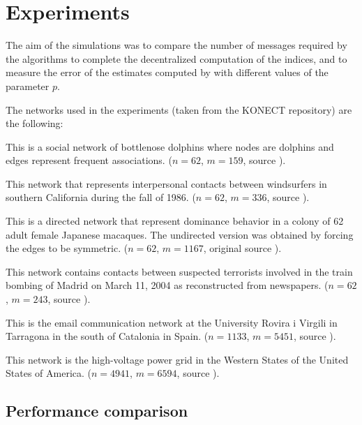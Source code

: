 
\section{Experiments}
\label{sec:exp}

The aim of the simulations was to compare the number of messages required by the algorithms to complete the decentralized computation of the indices, and to measure the error of the estimates computed by \multibfs{} with different values of the parameter $p$.

The networks used in the experiments (taken from the KONECT \cite{konect} repository) are the following:
\begin{description}[leftmargin=0cm]
 \item[\texttt{dolphins}] This is a social network of bottlenose dolphins where nodes are dolphins and edges represent frequent associations. ($n=62$, $m=159$, source \cite{network:dolphins}).
 \item[\texttt{surf}] This network that represents interpersonal contacts between windsurfers in southern California during the fall of 1986. ($n=62$, $m=336$, source \cite{network:surf}).
 \item[\texttt{macaques}] This is a directed network that represent dominance behavior in a colony of 62 adult female Japanese macaques. The undirected version was obtained by forcing the edges to be symmetric. ($n=62$, $m=1167$, original source \cite{network:mac}).
 \item[\texttt{train}] This network contains contacts between suspected terrorists involved in the train bombing of Madrid on March 11, 2004 as reconstructed from newspapers. ($n=62$, $m=243$, source \cite{network:train}).
 \item[\texttt{email}] This is the email communication network at the University Rovira i Virgili in Tarragona in the south of Catalonia in Spain. ($n=1133$, $m=5451$, source \cite{network:email}).
 \item[\texttt{powergrid}] This network is the high-voltage power grid in the Western States of the United States of America. ($n=4941$, $m=6594$, source \cite{network:powergrid}).
\end{description}

\subsection{Performance comparison}

